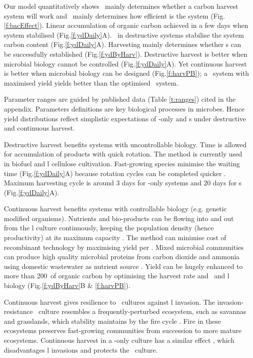 \documentclass[../thesis.tex]{subfiles} %
\begin{document}
Our model quantitatively shows \bac\ mainly determines whether a carbon harvest system will work and \phy\ mainly determines how efficient is the system (Fig.\ref{f:bacEffect}).  Linear accumulation of organic carbon achieved in a few days when system stabilised (Fig.\ref{f:ydDaily}A).  \Bac\ in destructive systems stabilise the system carbon content (Fig.\ref{f:ydDaily}A).  Harvesting mainly determines whether \pbs s can be successfully established (Fig.\ref{f:ydByHarv}).  Destructive harvest is better when microbial biology cannot be controlled (Fig.\ref{f:ydDaily}A).  Yet continuous harvest is better when microbial biology can be designed (Fig.\ref{f:harvPB}); a \PBH\ system with maximised yield yields better than the optimised \PBN\ system.

Parameter ranges are guided by published data (Table \ref{t:ranges}) cited in the appendix.  Parameters definitions are key biological processes in microbes.  Hence yield distributions reflect simplistic expectations of \phy-only and \pbs s under destructive and continuous harvest.

Destructive harvest benefits systems with uncontrollable biology.  Time is allowed for accumulation of products with quick rotation.  The method is currently used in biofuel \autocite{robertson2017cellulosic} and \bac l cellulose \autocite{aytekin2016statistical} cultivation.  Fast-growing species minimise the waiting time (Fig.\ref{f:ydDaily}A) because rotation cycles can be completed quicker \autocite{robertson2017cellulosic}.  Maximum harvesting cycle is around 3 days for \phy-only systems and 20 days for \pbs s (Fig.\ref{f:ydDaily}A).

Continuous harvest benefits systems with controllable biology (e.g. genetic modified organisms).  Nutrients and bio-products can be flowing into and out from the \bac l culture continuously, keeping the population density (hence productivity) at its maximum capacity \autocite{huang2012industrial,matassa2016autotrophic}.  The method can minimise cost of recombinant technology by maximising yield per \bac.  Mixed microbial communities can produce high quality microbial proteins from carbon dioxide and ammonia using domestic wastewater as nutrient source \autocite{matassa2016autotrophic}.  Yield can be hugely enhanced to more than 200\dxdt\ of organic carbon by optimising the harvest rate and \phy\ and \bac l biology (Fig.\ref{f:ydByHarv}B \& \ref{f:harvPB}).

Continuous harvest gives resilience to \phy\ cultures against \bac l invasion.  The invasion-resistance \phy\ culture resembles a frequently-perturbed ecosystem, such as savannas and grasslands, which stability maintains by the fire cycle \autocite{dass2018grasslands,trollope1984fire}.  Fire in these ecosystems preserves fast-growing communities \autocite{trollope1984fire} from succession to more mature ecosystems.  Continuous harvest in a \phy-only culture has a similar effect \autocite{sharp2017robust}, which disadvantages \bac l invasions and protects the \phy\ culture.
\end{document}
